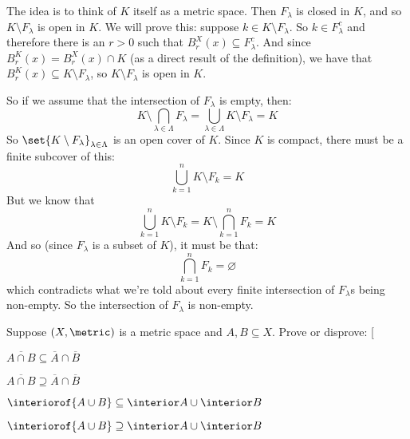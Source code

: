 \documentclass[10pt]{article}
\makeatletter
\def\@blist[#1]{%
    \bgroup\bgroup\par\vskip-\medskipamount%
    \gdef\item{%
        \par\egroup\bgroup\medskip\setbox0=\hbox{#1\quad}%
        \advance\leftskip by \wd0\leavevmode\kern-\wd0\box0%
    }%
}
\def\blist{\@ifnextchar[ \@blist {\@blist[$\bullet$]}}
\def\elist{\par\egroup\egroup\medskip}
\makeatother
\begin{document}
\begin{blankpp}

    The idea is to think of $K$ itself as a metric space.
    Then $F_\lambda$ is closed in $K$, and so $K\setminus F_\lambda$ is open in $K$.
    We will prove this: suppose $k\in K\setminus F_\lambda$.
    So $k\in F_\lambda^c$ and therefore there is an $r>0$ such that $B_r^X(x)\subseteq F_\lambda^c$.
    And since $B_r^K(x) = B_r^X(x)\cap K$ (as a direct result of the definition), we have that
    $B_r^K(x)\subseteq K\setminus F_\lambda$, so $K\setminus F_\lambda$ is open in $K$.

    So if we assume that the intersection of $F_\lambda$ is empty, then:
    \[ K\setminus\bigcap_{\lambda\in\Lambda} F_\lambda = \bigcup_{\lambda\in\Lambda} K\setminus F_\lambda = K \]
    So $\set{K\setminus F_\lambda}_{\lambda\in\Lambda}$ is an open cover of $K$.
    Since $K$ is compact, there must be a finite subcover of this:
    \[ \bigcup_{k=1}^n K\setminus F_k = K \]
    But we know that
    \[ \bigcup_{k=1}^n K\setminus F_k = K\setminus\bigcap_{k=1}^n F_k = K \]
    And so (since $F_\lambda$ is a subset of $K$), it must be that:
    \[ \bigcap_{k=1}^n F_k = \varnothing \]
    which contradicts what we're told about every finite intersection of $F_\lambda$s being non-empty.
    So the intersection of $F_\lambda$ is non-empty.

\end{blankpp}

\begin{exercise*}

    Suppose $(X,\metric)$ is a metric space and $A,B\subseteq X$.
    Prove or disprove:
    \blist
        \item $\overline{A\cap B}\subseteq\overline A\cap\overline B$
        \item $\overline{A\cap B}\supseteq\overline A\cap\overline B$
        \item $\interiorof{A\cup B}\subseteq\interior A\cup\interior B$
        \item $\interiorof{A\cup B}\supseteq\interior A\cup\interior B$
    \elist

\end{exercise*}
\end{document}
